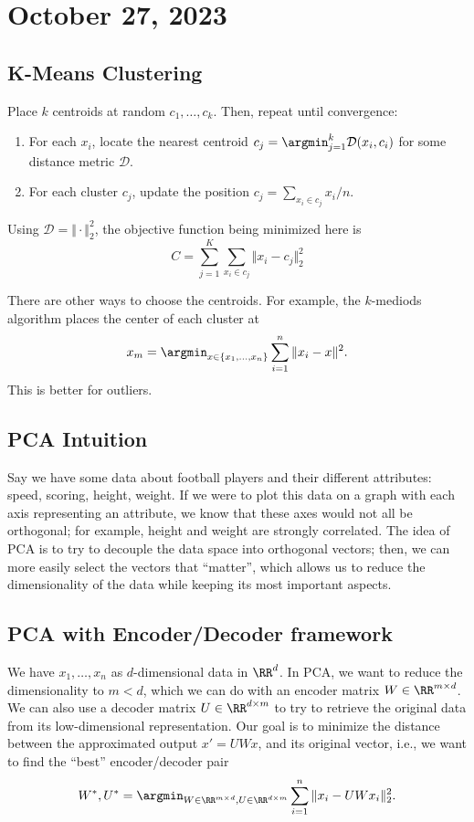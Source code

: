 \section{October 27, 2023}

\subsection{K-Means Clustering}

Place $k$ centroids at random $c_1, \hdots, c_k$. Then, repeat until convergence: 
\begin{enumerate}
	\item For each $x_i$, locate the nearest centroid $c_j = \argmin_{j=1}^k \mathcal{D}(x_i, c_i)$ for some distance metric $\mathcal{D}$. 
	\item For each cluster $c_j$, update the position $c_j = \sum_{x_i\in c_j} x_i / n$. 
\end{enumerate}

Using $\mathcal{D} = \Vert \cdot \Vert_2^2$, the objective function being minimized here is 
\[C = \sum_{j=1}^{K}\sum_{x_i\in c_j}\Vert x_i - c_j\Vert_2^2\]

There are other ways to choose the centroids. For example, the $k$-mediods algorithm places the center of each cluster at 
\[x_m = \argmin_{x\in \{x_1, \hdots, x_n\}}\sum_{i=1}^n\Vert x_i-x\Vert^2.\]
This is better for outliers. 

\subsection{PCA Intuition}

Say we have some data about football players and their different attributes: speed, scoring, height, weight. If we were to plot this data on a graph with each axis representing an attribute, we know that these axes would not all be orthogonal; for example, height and weight are strongly correlated. The idea of PCA is to try to decouple the data space into orthogonal vectors; then, we can more easily select the vectors that ``matter'', which allows us to reduce the dimensionality of the data while keeping its most important aspects.

\subsection{PCA with Encoder/Decoder framework}

We have $x_1,\hdots, x_n$ as $d$-dimensional data in $\RR^d$. In PCA, we want to reduce the dimensionality to $m < d$, which we can do with an encoder matrix $W\in \RR^{m\times d}$. We can also use a decoder matrix $U\in \RR^{d\times m}$ to try to retrieve the original data from its low-dimensional representation. Our goal is to minimize the distance between the approximated output $x' = UWx$, and its original vector, i.e., we want to find the ``best'' encoder/decoder pair 
\[W^*, U^* = \argmin_{W\in \RR^{m\times d}, U\in \RR^{d\times m}}\sum_{i=1}^n \Vert x_i - UWx_i\Vert_2^2.\]

